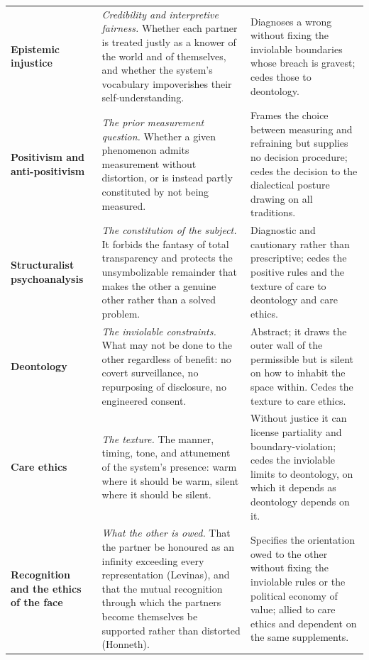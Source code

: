 \documentclass[11pt,a4paper]{article}
\begin{document}
\begin{small}
\begin{longtable}{@{}>{\raggedright\arraybackslash}p{} >{\raggedright\arraybackslash}p{} >{\raggedright\arraybackslash}p{}@{}}
\textbf{Epistemic injustice} \parencite{fricker2007epistemic} & \emph{Credibility and interpretive fairness.} Whether each partner is treated justly as a knower of the world and of themselves, and whether the system's vocabulary impoverishes their self-understanding. & Diagnoses a wrong without fixing the inviolable boundaries whose breach is gravest; cedes those to deontology.\\

\textbf{Positivism and anti-positivism} \parencite{dilthey1989introduction, weber1978economy, geertz1973interpretation} & \emph{The prior measurement question.} Whether a given phenomenon admits measurement without distortion, or is instead partly constituted by not being measured. & Frames the choice between measuring and refraining but supplies no decision procedure; cedes the decision to the dialectical posture drawing on all traditions.\\

\textbf{Structuralist psychoanalysis} \parencite{saussure1916course, lacan2006ecrits, lacan1977four, zizek1989sublime} & \emph{The constitution of the subject.} It forbids the fantasy of total transparency and protects the unsymbolizable remainder that makes the other a genuine other rather than a solved problem. & Diagnostic and cautionary rather than prescriptive; cedes the positive rules and the texture of care to deontology and care ethics.\\

\textbf{Deontology} \parencite{kant1785groundwork} & \emph{The inviolable constraints.} What may not be done to the other regardless of benefit: no covert surveillance, no repurposing of disclosure, no engineered consent. & Abstract; it draws the outer wall of the permissible but is silent on how to inhabit the space within. Cedes the texture to care ethics.\\

\textbf{Care ethics} \parencite{gilligan1982voice, noddings1984caring, held2006ethics, tronto1993moral} & \emph{The texture.} The manner, timing, tone, and attunement of the system's presence: warm where it should be warm, silent where it should be silent. & Without justice it can license partiality and boundary-violation; cedes the inviolable limits to deontology, on which it depends as deontology depends on it.\\

\textbf{Recognition and the ethics of the face} \parencite{levinas1969totality, honneth1995struggle} & \emph{What the other is owed.} That the partner be honoured as an infinity exceeding every representation (Levinas), and that the mutual recognition through which the partners become themselves be supported rather than distorted (Honneth). & Specifies the orientation owed to the other without fixing the inviolable rules or the political economy of value; allied to care ethics and dependent on the same supplements.\\


\end{longtable}
\end{small}
\end{document}
